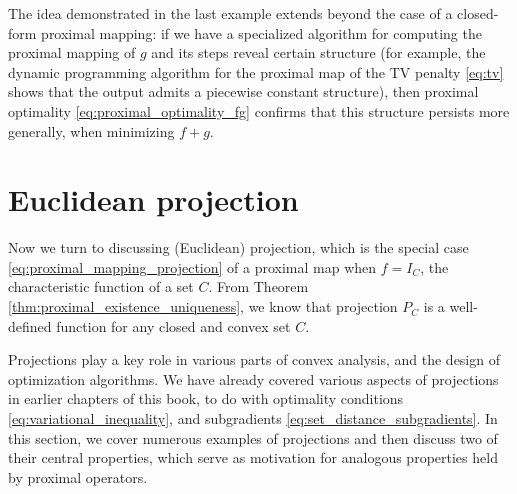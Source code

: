 The idea demonstrated in the last example extends beyond the case of a
closed-form proximal mapping: if we have a specialized algorithm for computing
the proximal mapping of $g$ and its steps reveal certain structure (for
example, the dynamic programming algorithm for the proximal map of the TV
penalty \eqref{eq:tv} shows that the output admits a piecewise constant
structure), then proximal optimality \eqref{eq:proximal_optimality_fg} confirms
that this structure persists more generally, when minimizing $f+g$.

\section{Euclidean projection}

Now we turn to discussing (Euclidean) projection, which is the special case
\eqref{eq:proximal_mapping_projection} of a proximal map when $f = I_C$, the
characteristic function of a set $C$. From Theorem
\ref{thm:proximal_existence_uniqueness}, we know that projection $P_C$ is a 
well-defined function for any closed and convex set $C$. 

Projections play a key role in various parts of convex analysis, and the design
of optimization algorithms. We have already covered various aspects of
projections in earlier chapters of this book, to do with optimality conditions 
\eqref{eq:variational_inequality}, and subgradients
\eqref{eq:set_distance_subgradients}. In this section, we cover numerous
examples of projections and then discuss two of their central properties, which 
serve as motivation for analogous properties held by proximal operators.  

